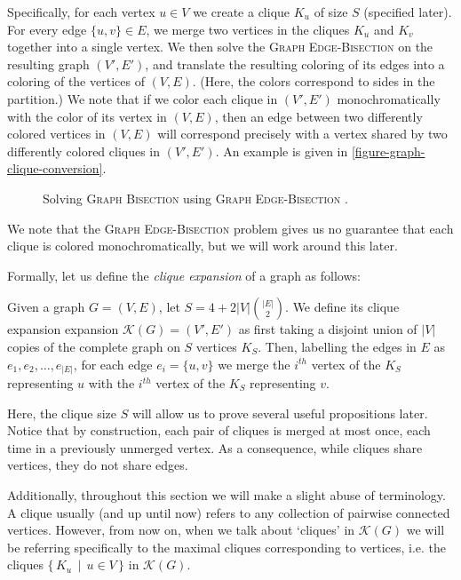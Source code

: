 \documentclass{article}
\newcommand{\gb}{\textsc{Graph \allowbreak Bisection} }
\newcommand{\geb}{\textsc{Graph \allowbreak Edge-\allowbreak Bisection} }
\begin{document}
	Specifically, for each vertex $u \in V$ we create a clique $K_u$ of size
	$S$ (specified later). For every edge $\{u, v\} \in E$, we merge
	two vertices in the cliques $K_u$ and $K_v$ together into a single
	vertex. We then solve the \geb on the resulting graph $(V', E')$, and
	translate the resulting coloring of its edges into a coloring of the
	vertices of $(V, E)$. (Here, the colors correspond to sides in the
	partition.) We note that if we color each clique in $(V', E')$
	monochromatically with the color of its vertex in $(V, E)$, then
	an edge between two differently colored vertices in $(V, E)$ will
	correspond precisely with a vertex shared by two differently colored
	cliques in $(V', E')$.
	An example is given in \autoref{figure-graph-clique-conversion}.

	\begin{figure}[h]
		
		\centering
		\caption{Solving \gb using \geb.}
		\label{figure-graph-clique-conversion}
	\end{figure}

	We note that
	the \geb problem gives us no guarantee that each clique is colored
	monochromatically, but we will work around this later.

	Formally, let us define the \textit{clique expansion} of a graph as
	follows:

	\begin{definition}
		\label{clique-expansion}
		Given a graph $G = (V, E)$,
		let $S = 4 + 2|V|\binom{|E|}{2}$.
		We define its clique expansion expansion
		$\mathcal{K}(G) = (V', E')$ as first taking a disjoint union of $|V|$
		copies of the complete graph on $S$ vertices $K_S$. Then, labelling the
		edges in $E$ as $e_1, e_2, \dots, e_{|E|}$, for each edge
		$e_i = \{u, v\}$
		we merge the $i^{th}$ vertex of the $K_S$ representing $u$ with the
		$i^{th}$ vertex of the $K_S$ representing $v$.
	\end{definition}

	Here, the clique size $S$ will allow us to prove several
	useful propositions later. Notice that by construction, each pair of
	cliques is merged at most once, each time in a previously unmerged vertex.
	As a consequence, while cliques share vertices, they do not share edges.

	Additionally, throughout this section we will make a slight abuse of
	terminology. A clique usually (and up until now) refers to any collection
	of pairwise connected vertices. However, from now on, when we talk about
	`cliques' in $\mathcal{K}(G)$ we will be referring specifically to the
	maximal cliques corresponding to vertices, i.e. the cliques
	$\{\, K_u \,\mid\, u \in V \,\}$ in $\mathcal{K}(G)$.
\end{document}
